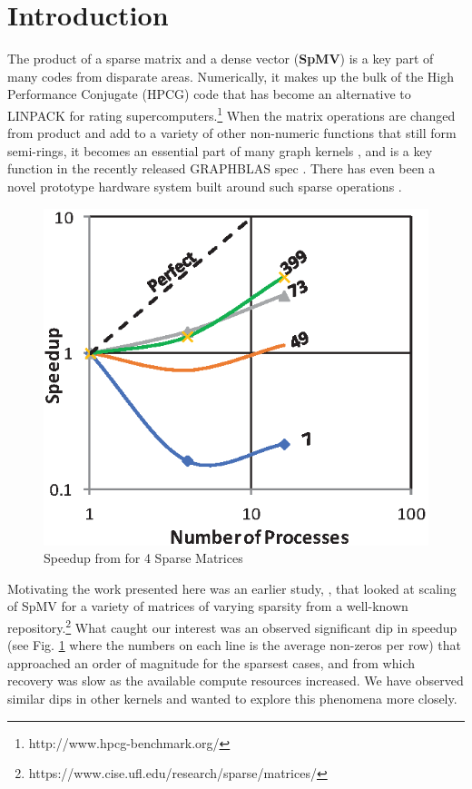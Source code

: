 \section{Introduction}\label{sec:dspmv-intro}

The product of a sparse matrix and a dense vector (\textbf{SpMV}) is a key part of many codes from disparate areas. Numerically, it makes up the bulk of the High Performance Conjugate (HPCG) \cite{techbib:hpcg-snl-dongarra} code that has become an alternative to LINPACK for rating supercomputers.\footnote{http://www.hpcg-benchmark.org/} When the matrix operations are changed from product and add to a variety of other non-numeric functions that still form semi-rings, it becomes an essential part of many graph kernels \cite{bigdata:doi:10.1137/1.9780898719918}, and is a key function in the recently released GRAPHBLAS spec \cite{graphblas}. There has even been a novel prototype hardware system built around such sparse operations \cite{techbib:song-hpec}.

\begin{figure}\begin{centering}
		\includegraphics[scale=0.70]{figures/spmv-bylina-speedup.eps}
		\caption{Speedup from \cite{techbib:6933066} for 4 Sparse Matrices}
		\label{fig:spmv-bylina-speedup}
\end{centering}\end{figure}

Motivating the work presented here was an earlier study, \cite{techbib:6933066}, that looked at scaling of SpMV for a variety of matrices of varying sparsity from a well-known repository.\footnote{https://www.cise.ufl.edu/research/sparse/matrices/} What caught our interest was an observed significant dip in speedup (see Fig. \ref{fig:spmv-bylina-speedup} where the numbers on each line is the average non-zeros per row) that approached an order of magnitude  for the sparsest cases, and from which recovery was slow as the available compute resources increased. We have observed similar dips in other kernels and wanted to explore this phenomena more closely. 

